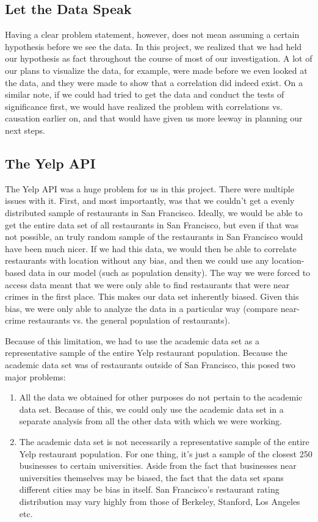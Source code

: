 \documentclass{article}
\begin{document}
\subsection{Let the Data Speak}

Having a clear problem statement, however, does not mean assuming a certain
hypothesis before we see the data. In this project, we realized that we had
held our hypothesis as fact throughout the course of most of our
investigation. A lot of our plans to visualize the data, for example, were
made before we even looked at the data, and they were made to show that a
correlation did indeed exist. On a similar note, if we could had tried to
get the data and conduct the tests of significance first, we would have
realized the problem with correlations vs. causation earlier on, and that
would have given us more leeway in planning our next steps.

\subsection{The Yelp API}

The Yelp API was a huge problem for us in this project. There were multiple
issues with it. First, and most importantly, was that we couldn't get a
evenly distributed sample of restaurants in San Francisco. Ideally, we
would be able to get the entire data set of all restaurants in San
Francisco, but even if that was not possible, an truly random sample of the
restaurants in San Francisco would have been much nicer. If we had this
data, we would then be able to correlate restaurants with location without
any bias, and then we could use any location-based data in our model (such
as population density). The way we were forced to access data meant that we
were only able to find restaurants that were near crimes in the first
place. This makes our data set inherently biased. Given this bias, we were
only able to analyze the data in a particular way (compare near-crime
restaurants vs. the general population of restaurants).

Because of this limitation, we had to use the academic data set as a
representative sample of the entire Yelp restaurant population. Because the
academic data set was of restaurants outside of San Francisco, this posed
two major problems:
\begin{enumerate}
\item All the data we obtained for other purposes do not pertain to the
  academic data set. Because of this, we could only use the academic data
  set in a separate analysis from all the other data with which we were
  working.
\item The academic data set is not necessarily a representative sample of
  the entire Yelp restaurant population. For one thing, it's just a sample
  of the closest 250 businesses to certain universities. Aside from the
  fact that businesses near universities themselves may be biased, the fact
  that the data set spans different cities may be bias in itself. San
  Francisco's restaurant rating distribution may vary highly from those of
  Berkeley, Stanford, Los Angeles etc.
\end{enumerate}
\end{document}
